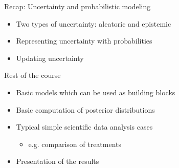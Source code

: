 \documentclass[10pt]{beamer}
\begin{document}
\begin{frame}{Recap: Uncertainty and probabilistic modeling}

  \begin{itemize}
  \item Two types of uncertainty: aleatoric and epistemic
    \vspace{\baselineskip}
  \item Representing uncertainty with probabilities
    \vspace{\baselineskip}
  \item Updating uncertainty
    \vspace{\baselineskip}
   \end{itemize}
\end{frame}

%

\begin{frame}{Rest of the course}

  \begin{itemize}
  \item Basic models which can be used as building blocks
    \vspace{\baselineskip}
  \item Basic computation of posterior distributions
    \vspace{\baselineskip}
  \item Typical simple scientific data analysis cases
     \begin{itemize}
     \item e.g. comparison of treatments
     \end{itemize}
    \vspace{\baselineskip}
  \item Presentation of the results
  \end{itemize}
\end{frame}
\end{document}
